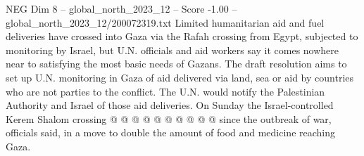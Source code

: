 \begin{textsample}{NEG Dim 8 – global\_north\_2023\_12 – Score -1.00 – global\_north\_2023\_12/200072319.txt}
Limited humanitarian aid and fuel deliveries have crossed into Gaza via the Rafah crossing from Egypt, subjected to monitoring by Israel, but U.N. officials and aid workers say it comes nowhere near to satisfying the most basic needs of Gazans.
The draft resolution aims to set up U.N. monitoring in Gaza of aid delivered via land, sea or aid by countries who are not parties to the conflict.
The U.N. would notify the Palestinian Authority and Israel of those aid deliveries.
On Sunday the Israel-controlled Kerem Shalom crossing @ @ @ @ @ @ @ @ @ @ since the outbreak of war, officials said, in a move to double the amount of food and medicine reaching Gaza.

\end{textsample}
